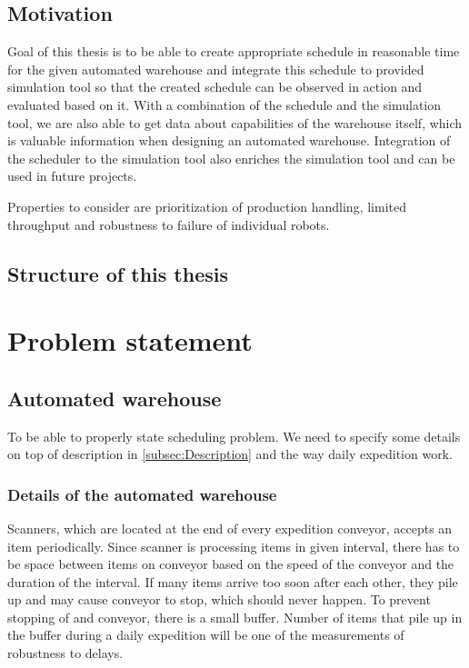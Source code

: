 \documentclass{ctuthesis}
\begin{document}
\section{Motivation}

Goal of this thesis is to be able to create appropriate schedule in reasonable time for the given automated warehouse and integrate this schedule to provided simulation tool so that the created schedule can be observed in action and evaluated based on it. With a combination of the schedule and the simulation tool, we are also able to get data about capabilities of the warehouse itself, which is valuable information when designing an automated warehouse. Integration of the scheduler to the simulation tool also enriches the simulation tool and can be used in future projects.

Properties to consider are prioritization of production handling, limited throughput and robustness to failure of individual robots. 

\section{Structure of this thesis}



\chapter{Problem statement}
\section{Automated warehouse}
\label{sec:Automated warehouse}
To be able to properly state scheduling problem. We need to specify some details on top of description in \ref{subsec:Description} and the way daily expedition work.

\subsection{Details of the automated warehouse}

Scanners, which are located at the end of every expedition conveyor, accepts an item periodically. Since scanner is processing items in given interval, there has to be space between items on conveyor based on the speed of the conveyor and the duration of the interval. If many items arrive too soon after each other, they pile up and may cause conveyor to stop, which should never happen. To prevent stopping of and conveyor, there is a small buffer. Number of items that pile up in the buffer during a daily expedition will be one of the measurements of robustness to delays.
\end{document}
